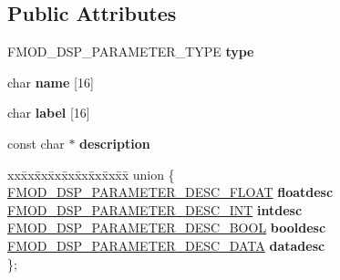 \subsection*{Public Attributes}
\begin{DoxyCompactItemize}
\item 
\mbox{\label{structFMOD__DSP__PARAMETER__DESC_aaab6f223d98d5c4c1964764f7a3af27b}} 
F\+M\+O\+D\+\_\+\+D\+S\+P\+\_\+\+P\+A\+R\+A\+M\+E\+T\+E\+R\+\_\+\+T\+Y\+PE {\bfseries type}
\item 
\mbox{\label{structFMOD__DSP__PARAMETER__DESC_a708407efaeeb92e3af8aac67aff71d87}} 
char {\bfseries name} \mbox{[}16\mbox{]}
\item 
\mbox{\label{structFMOD__DSP__PARAMETER__DESC_adbc2b8d42467dd58900d552b2459d99d}} 
char {\bfseries label} \mbox{[}16\mbox{]}
\item 
\mbox{\label{structFMOD__DSP__PARAMETER__DESC_a7cbe03eaa94332ccc1227c857f43fb3e}} 
const char $\ast$ {\bfseries description}
\item 
\mbox{\label{structFMOD__DSP__PARAMETER__DESC_a694da7c2ce7957b4182275fb87093ae4}} 
\begin{tabbing}
xx\=xx\=xx\=xx\=xx\=xx\=xx\=xx\=xx\=\kill
union \{\\
\>\hyperlink{structFMOD__DSP__PARAMETER__DESC__FLOAT}{FMOD\_DSP\_PARAMETER\_DESC\_FLOAT} {\bfseries floatdesc}\\
\>\hyperlink{structFMOD__DSP__PARAMETER__DESC__INT}{FMOD\_DSP\_PARAMETER\_DESC\_INT} {\bfseries intdesc}\\
\>\hyperlink{structFMOD__DSP__PARAMETER__DESC__BOOL}{FMOD\_DSP\_PARAMETER\_DESC\_BOOL} {\bfseries booldesc}\\
\>\hyperlink{structFMOD__DSP__PARAMETER__DESC__DATA}{FMOD\_DSP\_PARAMETER\_DESC\_DATA} {\bfseries datadesc}\\
\}; \\


\end{tabbing}
\end{DoxyCompactItemize}
